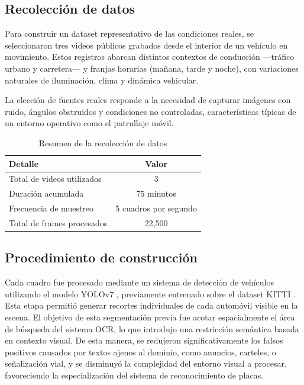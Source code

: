 \documentclass[conference]{IEEEtran}
\begin{document}
\subsection{Recolección de datos}

Para construir un dataset representativo de las condiciones reales, se seleccionaron tres videos públicos grabados desde el interior de un vehículo en movimiento. Estos registros abarcan distintos contextos de conducción —tráfico urbano y carretera— y franjas horarias (mañana, tarde y noche), con variaciones naturales de iluminación, clima y dinámica vehicular.

La elección de fuentes reales responde a la necesidad de capturar imágenes con ruido, ángulos obstruidos y condiciones no controladas, características típicas de un entorno operativo como el patrullaje móvil. 

\begin{table}[h]
\centering
\caption{Resumen de la recolección de datos}
\label{tab:dataset-summary}
\begin{tabular}{|l|c|}
\hline
\textbf{Detalle} & \textbf{Valor} \\
\hline
Total de videos utilizados & 3 \\
Duración acumulada         & 75 minutos \\
Frecuencia de muestreo     & 5 cuadros por segundo \\
Total de frames procesados & 22,500 \\
\hline
\end{tabular}
\end{table}


\subsection{Procedimiento de construcción}

Cada cuadro fue procesado mediante un sistema de detección de vehículos utilizando el modelo YOLOv7 \cite{wang2022yolov7}, previamente entrenado sobre el dataset KITTI \cite{geiger2012kitti}. Esta etapa permitió generar recortes individuales de cada automóvil visible en la escena. El objetivo de esta segmentación previa fue acotar espacialmente el área de búsqueda del sistema OCR, lo que introdujo una restricción semántica basada en contexto visual. De esta manera, se redujeron significativamente los falsos positivos causados por textos ajenos al dominio, como anuncios, carteles, o señalización vial, y se disminuyó la complejidad del entorno visual a procesar, favoreciendo la especialización del sistema de reconocimiento de placas.
\end{document}
